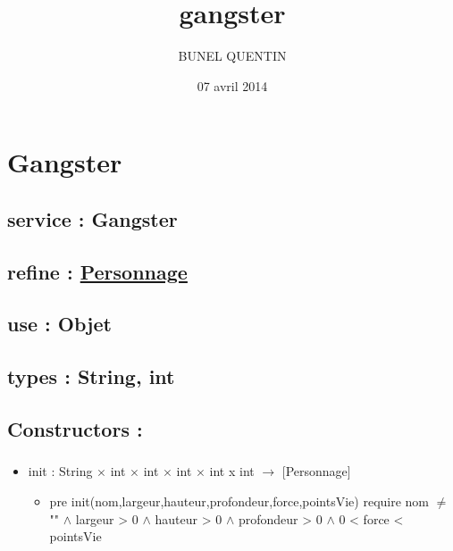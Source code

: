 \documentclass[11pt]{article}
\title{gangster}
\author{BUNEL QUENTIN}
\date{07 avril 2014}
\begin{document}
\maketitle

\setcounter{tocdepth}{3}
\tableofcontents
\vspace*{1cm}
\section{Gangster}
\label{sec-1}

\subsection{service : Gangster}
\label{sec-1.1}

\subsection{refine : \href{file:///users/Etu5/3000675/Desktop/spec/personnage.org}{Personnage}}
\label{sec-1.2}

\subsection{use : Objet}
\label{sec-1.3}

\subsection{types : String, int}
\label{sec-1.4}


\subsection{Constructors :}
\label{sec-1.5}

\subsubsection{}

\begin{itemize}

\item init : String $\times$ int $\times$ int $\times$ int $\times$ int x int $\to$ [Personnage]\\
\label{sec-1.5.1.1}

\begin{itemize}

\item pre init(nom,largeur,hauteur,profondeur,force,pointsVie) require nom $\neq$ "" $\wedge$ largeur > 0 $\wedge$ hauteur > 0 $\wedge$ profondeur > 0 $\wedge$ 0 < force < pointsVie\\
\label{sec-1.5.1.1.1}

\end{itemize} %
\end{itemize} %
\end{document}
